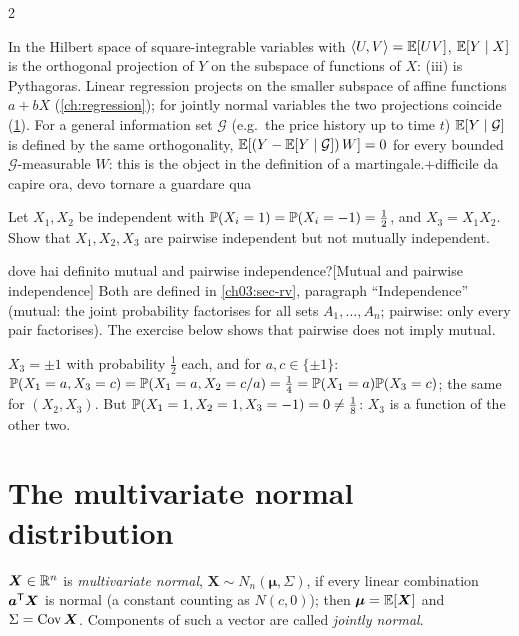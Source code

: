 \begin{paracol}{2}
\begin{intuition}
In the Hilbert space of square-integrable variables with $\langle U,V\rangle=\mathbb{E}[UV]$, $\mathbb{E}[Y\mid X]$ is the orthogonal
projection of $Y$ on the subspace of functions of $X$: (iii) is Pythagoras. Linear regression projects on the
smaller subspace of affine functions $a+bX$ (\cref{ch:regression}); for jointly normal variables the two
projections coincide (\cref{ch03:sec-mvn}). For a general information set $\mathcal G$ (e.g.\ the price history up
to time $t$) $\mathbb{E}[Y\mid\mathcal G]$ is defined by the same orthogonality, $\mathbb{E}[(Y-\mathbb{E}[Y\mid\mathcal G])\,W]=0$ for every
bounded $\mathcal G$-measurable $W$: this is the object in the definition of a martingale.\note+{difficile da capire ora, devo tornare a guardare qua}
\end{intuition}

\begin{exercise}\label{ch03:ex-pairwise}
Let $X_1,X_2$ be independent with $\mathbb{P}(X_i=1)=\mathbb{P}(X_i=-1)=\frac12$, and $X_3=X_1X_2$. Show that $X_1,X_2,X_3$ are pairwise
independent but not mutually independent.\begin{answer}{dove hai definito mutual and pairwise independence?}[Mutual and pairwise independence]
Both are defined in \cref{ch03:sec-rv}, paragraph ``Independence'' (mutual: the joint probability factorises for all sets
$A_1,\dots,A_n$; pairwise: only every pair factorises). The exercise below shows that pairwise does not imply mutual.
\end{answer}
\end{exercise}
\begin{solution}[ch03:ex-pairwise]
$X_3=\pm1$ with probability $\frac12$ each, and for $a,c\in\{\pm1\}$: $\mathbb{P}(X_1=a,X_3=c)=\mathbb{P}(X_1=a,X_2=c/a)=\frac14=\mathbb{P}(X_1=a)\mathbb{P}(X_3=c)$;
the same for $(X_2,X_3)$. But $\mathbb{P}(X_1=1,X_2=1,X_3=-1)=0\ne\frac18$: $X_3$ is a function of the other two.
\end{solution}

\section{The multivariate normal distribution}\label{ch03:sec-mvn}

\begin{definition}
$\bm X\in\mathbb{R}^n$ is \emph{multivariate normal}, $\bm X\sim N_n(\bm\mu,\Sigma)$, if every linear combination $\bm a^{\mathsf T}\bm X$ is
normal (a constant counting as $N(c,0)$); then $\bm\mu=\mathbb{E}[\bm X]$ and $\Sigma=\operatorname{Cov}\bm X$. Components of such a vector are
called \emph{jointly normal}.
\end{definition}


\end{paracol}
